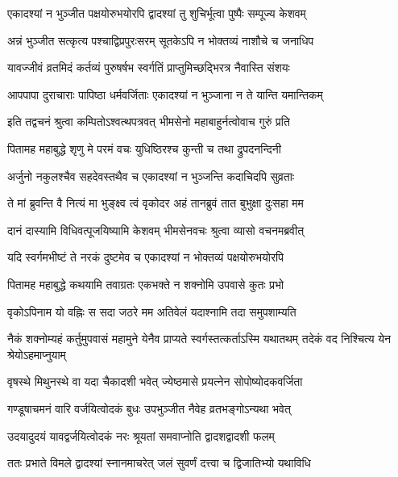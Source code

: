 \twolineshloka
{एकादश्यां न भुञ्जीत पक्षयोरुभयोरपि}
{द्वादश्यां तु शुचिर्भूत्वा पुष्पैः सम्पूज्य केशवम्}%

\twolineshloka
{अन्नं भुञ्जीत सत्कृत्य पश्चाद्विप्रपुरःसरम्}
{सूतकेऽपि न भोक्तव्यं नाशौचे च जनाधिप}%

\twolineshloka
{यावज्जीवं व्रतमिदं कर्तव्यं पुरुषर्षभ}
{स्वर्गतिं प्राप्तुमिच्छद्भिरत्र नैवास्ति संशयः}%

\twolineshloka
{आपपापा दुराचाराः पापिष्ठा धर्मवर्जिताः}
{एकादश्यां न भुञ्जाना न ते यान्ति यमान्तिकम्}%

\twolineshloka
{इति तद्वचनं श्रुत्वा कम्पितोऽश्वत्थपत्रवत्}
{भीमसेनो महाबाहुर्नत्वोवाच गुरुं प्रति}%


\twolineshloka
{पितामह महाबुद्धे शृणु मे परमं वचः}
{युधिष्ठिरश्च कुन्ती च तथा द्रुपदनन्दिनी}%

\twolineshloka
{अर्जुनो नकुलश्चैव सहदेवस्तथैव च}
{एकादश्यां न भुञ्जन्ति कदाचिदपि सुव्रताः}%

\twolineshloka
{ते मां ब्रुवन्ति वै नित्यं मा भुङ्क्ष्व त्वं वृकोदर}
{अहं तानब्रुवं तात बुभुक्षा दुःसहा मम}%

\twolineshloka
{दानं दास्यामि विधिवत्पूजयिष्यामि केशवम्}
{भीमसेनवचः श्रुत्वा व्यासो वचनमब्रवीत्}%


\twolineshloka
{यदि स्वर्गमभीष्टं ते नरकं दुष्टमेव च}
{एकादश्यां न भोक्तव्यं पक्षयोरुभयोरपि}%


\twolineshloka
{पितामह महाबुद्धे कथयामि तवाग्रतः}
{एकभक्ते न शक्नोमि उपवासे कुतः प्रभो}%

\twolineshloka
{वृकोऽपिनाम यो वह्निः स सदा जठरे मम}
{अतिवेलं यदाश्नामि तदा समुपशाम्यति}%

\threelineshloka
{नैकं शक्नोम्यहं कर्तुमुपवासं महामुने}
{येनैव प्राप्यते स्वर्गस्तत्कर्ताऽस्मि यथातथम्}
{तदेकं वद निश्चित्य येन श्रेयोऽहमाप्नुयाम्}%


\twolineshloka
{वृषस्थे मिथुनस्थे वा यदा चैकादशी भवेत्}
{ज्येष्ठमासे प्रयत्नेन सोपोष्योदकवर्जिता}%

\twolineshloka
{गण्डूषाचमनं वारि वर्जयित्वोदकं बुधः}
{उपभुञ्जीत नैवेह व्रतभङ्गोऽन्यथा भवेत्}%

\twolineshloka
{उदयादुदयं यावद्वर्जयित्वोदकं नरः}
{श्रूयतां समवाप्नोति द्वादशद्वादशी फलम्}%

\twolineshloka
{ततः प्रभाते विमले द्वादश्यां स्नानमाचरेत्}
{जलं सुवर्णं दत्त्वा च द्विजातिभ्यो यथाविधि}%

